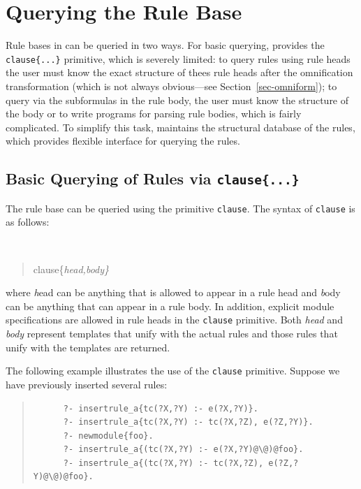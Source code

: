 \documentclass[11pt]{article}
\newcommand{\ERGO}{\mbox{\smaller{\ensuremath{\cal{E}}\smaller{{\sc{RGO}}}}}\xspace}
\begin{document}
\section{Querying the Rule Base}
\label{sec:clause}

Rule bases in \ERGO can be queried in two ways. For basic
querying, \ERGO provides the \texttt{clause\{...\}} primitive, which is
severely limited: to query rules 
using rule heads the user must know the exact structure of thees rule heads
after the omnification transformation (which is not always obvious---see
Section~\ref{sec-omniform}); to query via the subformulas in the rule
body, the user must know the structure of the body or to write programs
for parsing rule bodies, which is fairly complicated.
To simplify this task, \ERGO maintains the structural database of the
rules, which provides flexible interface for querying the rules.

\subsection{Basic Querying of Rules via \texttt{clause\{...\}}}

The rule base can be queried using the primitive {\tt clause}.  The
syntax of {\tt clause} is as follows:

{\tt
\begin{quote}
clause\{\it{head,body}\}
\end{quote}
}
\noindent
where {\emph head} can be anything that is allowed to appear in a rule
head and {\emph body} can be anything that
can appear in a rule body. In addition, explicit module specifications are
allowed in rule heads in the {\tt clause} primitive. 
Both \emph{head} and \emph{body} represent
templates that unify with the actual rules and those rules that unify
with the templates are returned.

The following example illustrates the use of the {\tt clause} primitive.
Suppose we have previously inserted several rules:
\begin{quote}
\begin{verbatim}
      ?- insertrule_a{tc(?X,?Y) :- e(?X,?Y)}.
      ?- insertrule_a{tc(?X,?Y) :- tc(?X,?Z), e(?Z,?Y)}.
      ?- newmodule{foo}.
      ?- insertrule_a{(tc(?X,?Y) :- e(?X,?Y)@\@)@foo}.
      ?- insertrule_a{(tc(?X,?Y) :- tc(?X,?Z), e(?Z,?Y)@\@)@foo}.
\end{verbatim}
\end{quote}
\end{document}
